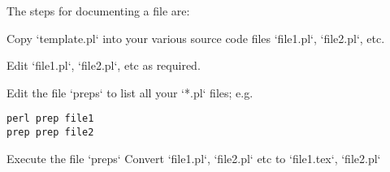 The steps for documenting a {\PROD} file are:
\be
\item
Copy `template.pl` into your various source
code files `file1.pl`, `file2.pl`, etc.
\item
Edit `file1.pl`, `file2.pl`, etc as required.
\item
Edit the file `preps` to list all your `*.pl` files; e.g.
{\footnotesize\begin{verbatim}
perl prep file1
prep prep file2
\end{verbatim}}
\item
Execute the file `preps`
Convert `file1.pl`, `file2.pl` etc to  `file1.tex`, `file2.pl`
{\footnotesize\begin{verbatim}

\end{verbatim}}
\ee
